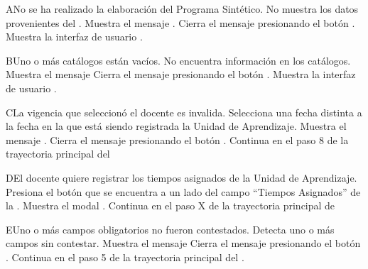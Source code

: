 \begin{UCtrayectoriaA}{A}{No se ha realizado la elaboración del Programa Sintético.}
	\UCpaso No muestra los datos provenientes del .
	\UCpaso Muestra el mensaje .
	\UCpaso[\UCactor] Cierra el mensaje presionando el botón .
	\UCpaso Muestra la interfaz de usuario .
\end{UCtrayectoriaA}




\begin{UCtrayectoriaA}{B}{Uno o más catálogos están vacíos.}
	\UCpaso No encuentra información en los catálogos.
    \UCpaso Muestra el mensaje 
    \UCpaso[\UCactor] Cierra el mensaje presionando el botón .
	\UCpaso Muestra la interfaz de usuario .
\end{UCtrayectoriaA}


\begin{UCtrayectoriaA}{C}{La vigencia que seleccionó el docente es invalida.}
	\UCpaso[\UCactor] Selecciona una fecha distinta a la fecha en la que está siendo registrada la Unidad de Aprendizaje.
	\UCpaso Muestra el mensaje .
	\UCpaso[\UCactor] Cierra el mensaje presionando el botón .
	\UCpaso Continua en el paso 8 de la trayectoria principal del 
\end{UCtrayectoriaA}


\begin{UCtrayectoriaA}{D}{El docente quiere registrar los tiempos asignados de la Unidad de Aprendizaje.}
	\UCpaso[\UCactor] Presiona el botón \BtnModal que se encuentra a un lado del campo ``Tiempos Asignados'' de la .
	\UCpaso Muestra el modal .
	\UCpaso Continua en el paso X de la trayectoria principal de 
\end{UCtrayectoriaA}


\begin{UCtrayectoriaA}{E}{Uno o más campos obligatorios no fueron contestados.}
	\UCpaso Detecta uno o más campos sin contestar.
    \UCpaso Muestra el mensaje 
    \UCpaso[\UCactor] Cierra el mensaje presionando el botón .
    \UCpaso Continua en el paso 5 de la trayectoria principal del .
\end{UCtrayectoriaA}